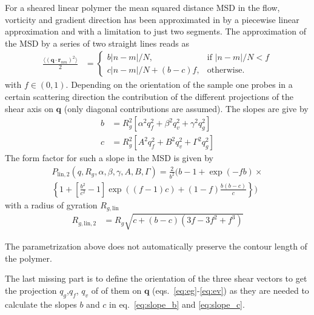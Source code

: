 For a sheared linear polymer the mean squared distance MSD in the flow, vorticity and gradient direction has been approximated in \cite{Korolkovas2019} by a piecewise linear approximation and with a limitation to just two segments.
The approximation of the MSD by a series of two straight lines reads as
\begin{align}\label{eq:2straightlines}
\frac{\langle(\mathbf{q}\cdot\mathbf{r}_{nm})^2\rangle}{2}  &=
\begin{cases}
  b|n-m|/N, & \mbox{if } |n-m|/N<f \\
  c|n-m|/N+(b-c)f, & \mbox{otherwise}.
\end{cases}
\end{align}
with $f\in (0,1)$. Depending on the orientation of the sample one probes in a certain scattering direction the contribution of the different projections of the shear axis on $\mathbf{q}$ (only diagonal contributions are assumed). The slopes are give by
\begin{align}
  b &= R_g^2 \left[\alpha^2q_f^2+\beta^2 q_v^2+\gamma^2 q_g^2\right] \label{eq:slope_b} \\
  c &= R_g^2 \left[A^2q_f^2+B^2 q_v^2+\mathit{\Gamma}^2 q_g^2\right] \label{eq:slope_c}
\end{align}
The form factor for such a slope in the MSD is given by
\begin{multline}\label{eq:slopes_bc_PQ}
P_\mathrm{lin,2}(q,R_g,\alpha,\beta,\gamma,A,B,\mathit{\Gamma}) = \frac{2}{b^2}\Bigg(b-1+\exp\left(-fb\right) \times \\
    \left\{1+\left[\frac{b^2}{c^2}-1\right]\exp\left((f-1)c\right)+(1-f)\frac{b(b-c)}{c}\right\}\Bigg)
\end{multline}
with a radius of gyration $R_{g,\mathrm{lin}}$
\begin{align}\label{eq:Rglin_straight}
  R_{g,\mathrm{lin,2}} &= R_{g}\sqrt{c+(b-c)\left(3f-3f^2+f^3\right)}
\end{align}


The parametrization above does not automatically preserve the contour length of the polymer.

The last missing part is to define the orientation of the three shear vectors to get the projection $q_g$,$q_f$, $q_v$ of of them on $\mathbf{q}$ (eqs.\ \ref{eq:eg}-\ref{eq:ev}) as they are needed to calculate the slopes $b$ and $c$ in eq.\ \ref{eq:slope_b} and \ref{eq:slope_c}.

